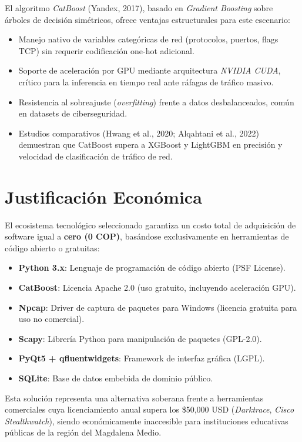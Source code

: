 \documentclass[12pt, letterpaper, oneside]{report}
\begin{document}
El algoritmo \textit{CatBoost} (Yandex, 2017), basado en \textit{Gradient Boosting} sobre árboles de decisión simétricos, ofrece ventajas estructurales para este escenario:

\begin{itemize}[leftmargin=*]
  \item Manejo nativo de variables categóricas de red (protocolos, puertos, flags TCP) sin requerir codificación one-hot adicional.
  \item Soporte de aceleración por GPU mediante arquitectura \textit{NVIDIA CUDA}, crítico para la inferencia en tiempo real ante ráfagas de tráfico masivo.
  \item Resistencia al sobreajuste (\textit{overfitting}) frente a datos desbalanceados, común en datasets de ciberseguridad.
  \item Estudios comparativos (Hwang et al., 2020; Alqahtani et al., 2022) demuestran que CatBoost supera a XGBoost y LightGBM en precisión y velocidad de clasificación de tráfico de red.
\end{itemize}

\section{Justificación Económica}

El ecosistema tecnológico seleccionado garantiza un costo total de adquisición de software igual a \textbf{cero (0 COP)}, basándose exclusivamente en herramientas de código abierto o gratuitas:

\begin{itemize}[leftmargin=*]
  \item \textbf{Python 3.x}: Lenguaje de programación de código abierto (PSF License).
  \item \textbf{CatBoost}: Licencia Apache 2.0 (uso gratuito, incluyendo aceleración GPU).
  \item \textbf{Npcap}: Driver de captura de paquetes para Windows (licencia gratuita para uso no comercial).
  \item \textbf{Scapy}: Librería Python para manipulación de paquetes (GPL-2.0).
  \item \textbf{PyQt5 + qfluentwidgets}: Framework de interfaz gráfica (LGPL).
  \item \textbf{SQLite}: Base de datos embebida de dominio público.
\end{itemize}

Esta solución representa una alternativa soberana frente a herramientas comerciales cuya licenciamiento anual supera los \$50,000 USD (\textit{Darktrace}, \textit{Cisco Stealthwatch}), siendo económicamente inaccesible para instituciones educativas públicas de la región del Magdalena Medio.
\end{document}
